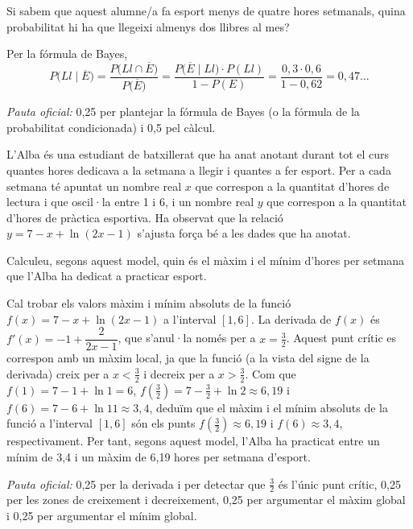 \begin{apartats}
Si sabem que aquest alumne/a fa esport menys de quatre hores setmanals, quina probabilitat hi ha que llegeixi
almenys dos llibres al mes?

\begin{solucio}
Per la fórmula de Bayes,
\[
P\bigl(Ll\mid\overline{E}\bigr)=\frac{P\bigl(Ll\cap\overline{E}\bigr)}{P\bigl(\overline{E}\bigr)}
=\frac{P\bigl(\overline{E}\mid Ll\bigr)\cdot P(Ll)}{1-P(E)}=\frac{0{,}3\cdot0{,}6}{1-0{,}62}=0{,}47\ldots
\]

\textit{Pauta oficial:} 0,25 per plantejar la fórmula de Bayes (o la fórmula de la probabilitat
condicionada) i 0,5 pel càlcul.
\end{solucio}

L'Alba és una estudiant de batxillerat que ha anat anotant durant tot el curs quantes hores dedicava a la
setmana a llegir i quantes a fer esport. Per a cada setmana té apuntat un nombre real $x$ que correspon a la
quantitat d'hores de lectura i que oscil·la entre 1 i 6, i un nombre real $y$ que correspon a la quantitat
d'hores de pràctica esportiva. Ha observat que la relació $y=7-x+\ln(2x-1)$ s'ajusta força bé a les dades
que ha anotat.

Calculeu, segons aquest model, quin és el màxim i el mínim d'hores per setmana que l'Alba ha dedicat a
practicar esport.

\begin{solucio}
Cal trobar els valors màxim i mínim absoluts de la funció $f(x)=7-x+\ln(2x-1)$ a l'interval $[1,6]$. La
derivada de $f(x)$ és $f'(x)=-1+\dfrac{2}{2x-1}$, que s'anul·la només per a $x=\frac32$. Aquest punt crític
es correspon amb un màxim local, ja que la funció (a la vista del signe de la derivada) creix per a
$x<\frac32$ i decreix per a $x>\frac32$. Com que $f(1)=7-1+\ln1=6$, $f\!\left(\frac32\right)=7-\frac32+\ln2
\approx6{,}19$ i $f(6)=7-6+\ln11\approx3{,}4$, deduïm que el màxim i el mínim absoluts de la funció a
l'interval $[1,6]$ són els punts $f\!\left(\frac32\right)\approx6{,}19$ i $f(6)\approx3{,}4$, respectivament.
Per tant, segons aquest model, l'Alba ha practicat entre un mínim de 3,4 i un màxim de 6,19 hores per
setmana d'esport.

\textit{Pauta oficial:} 0,25 per la derivada i per detectar que $\frac32$ és l'únic punt crític, 0,25 per
les zones de creixement i decreixement, 0,25 per argumentar el màxim global i 0,25 per argumentar el mínim
global.
\end{solucio}

\end{apartats}

